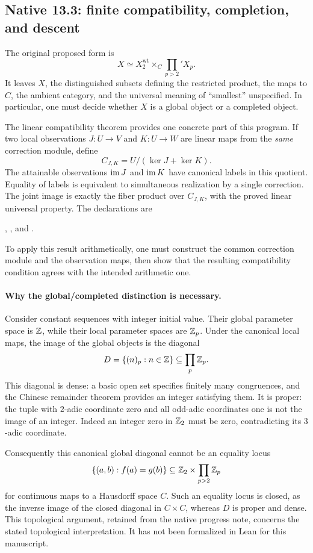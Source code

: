 \subsection{Native 13.3: finite compatibility, completion, and descent}
\label{subsec:native133}

The original proposed form is
\[
X\simeq X_2^{\mathrm{wt}}\times_C\prod_{p>2}'X_p.
\]
It leaves $X$, the distinguished subsets defining the restricted product,
the maps to $C$, the ambient category, and the universal meaning of
``smallest'' unspecified. In particular, one must decide whether $X$ is a
global object or a completed object.

The linear compatibility theorem provides one concrete part of this program.
If two local observations
$J:U\to V$ and $K:U\to W$ are linear maps from the \emph{same} correction
module, define
\[
C_{J,K}=U/(\ker J+\ker K).
\]
The attainable observations $\operatorname{im} J$ and $\operatorname{im} K$ have canonical labels in this
quotient. Equality of labels is equivalent to simultaneous realization by a
single correction. The joint image is exactly the fiber product over
$C_{J,K}$, with the proved linear universal property.
The declarations are
\begingroup\small\raggedright
{},
, and
.
\par\endgroup
To apply this result arithmetically, one must construct the common correction
module and the observation maps, then show that the resulting compatibility
condition agrees with the intended arithmetic one.

\paragraph{Why the global/completed distinction is necessary.}
Consider constant sequences with integer initial value. Their global parameter
space is $\mathbb Z$, while their local parameter spaces are $\mathbb Z_p$. Under the
canonical local maps, the image of the global objects is the diagonal
\[
D=\{(n)_p:n\in\mathbb Z\}\subseteq\prod_p\mathbb Z_p.
\]
This diagonal is dense: a basic open set specifies finitely many congruences,
and the Chinese remainder theorem provides an integer satisfying them. It is
proper: the tuple with $2$-adic coordinate zero and all odd-adic coordinates
one is not the image of an integer. Indeed an integer zero in $\mathbb Z_2$ must be
zero, contradicting its $3$-adic coordinate.

Consequently this canonical global diagonal cannot be an equality locus
\[
\{(a,b):f(a)=g(b)\}
\subseteq \mathbb Z_2\times\prod_{p>2}\mathbb Z_p
\]
for continuous maps to a Hausdorff space $C$. Such an equality locus is closed,
as the inverse image of the closed diagonal in $C\times C$, whereas $D$ is
proper and dense. This topological argument, retained from the native progress
note, concerns the stated topological interpretation. It has not been
formalized in Lean for this manuscript.

